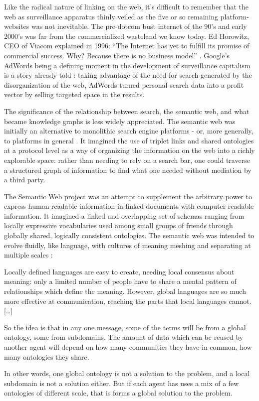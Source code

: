 \documentclass{article}
\renewenvironment{leftbar}
{\vspace{6pt}\def\FrameCommand{\hspace{0em}\vrule width 0.5pt \hspace{1em}}\MakeFramed {\advance\hsize-\width \FrameRestore}}
{\endMakeFramed}
\begin{document}
Like the radical nature of linking on the web, it's difficult to
remember that the web as surveillance apparatus thinly veiled as the
five or so remaining platform-websites was not inevitable. The
pre-dotcom bust internet of the 90's and early 2000's was far from the
commercialized wasteland we know today. Ed Horowitz, CEO of Viacom
explained in 1996: ``The Internet has yet to fulfill its promise of
commercial success. Why? Because there is no business model'' \cite{tarnoffInternetPeopleFight2022} . Google's AdWords being a defining
moment in the development of surveillance capitalism is a story already
told \cite{zuboffAgeSurveillanceCapitalism2019} : taking
advantage of the need for search generated by the disorganization of the
web, AdWords turned personal search data into a profit vector by selling
targeted space in the results.

The significance of the relationship between search, the semantic web,
and what became knowledge graphs is less widely appreciated. The
semantic web was initially an alternative to monolithic search engine
platforms - or, more generally, to platforms in general \cite{berners-leeSociallyAwareCloud2009} . It imagined the use of triplet
links and shared ontologies at a protocol level as a way of organizing
the information on the web into a richly explorable space: rather than
needing to rely on a search bar, one could traverse a structured graph
of information \cite{berners-leeLinkedData2006, berners-leeGoalsHumanDataInterface2010}  to find what one needed
without mediation by a third party.

The Semantic Web project was an attempt to supplement the arbitrary
power to express human-readable information in linked documents with
computer-readable information. It imagined a linked and overlapping set
of schemas ranging from locally expressive vocabularies used among small
groups of friends through globally shared, logically consistent
ontologies. The semantic web was intended to evolve fluidly, like
language, with cultures of meaning meshing and separating at multiple
scales \cite{berners-leeScalefreeNatureWeb1998, berners-leeSemanticWeb2001, berners-leeCulturesBoundaries2007} :

\begin{leftbar}
Locally defined languages are easy to create, needing local consensus
about meaning: only a limited number of people have to share a mental
pattern of relationships which define the meaning. However, global
languages are so much more effective at communication, reaching the
parts that local languages cannot. {[}\ldots{]}

So the idea is that in any one message, some of the terms will be from a
global ontology, some from subdomains. The amount of data which can be
reused by another agent will depend on how many communities they have in
common, how many ontologies they share.

In other words, one global ontology is not a solution to the problem,
and a local subdomain is not a solution either. But if each agent has
uses a mix of a few ontologies of different scale, that is forms a
global solution to the problem. \cite{berners-leeScalefreeNatureWeb1998} 
\end{leftbar}
\end{document}

